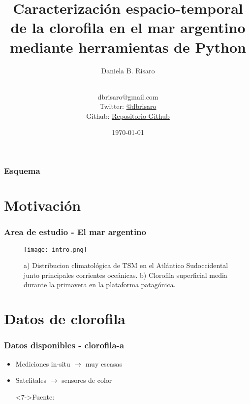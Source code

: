 \documentclass{beamer}
\title[Python para SIG]{Caracterización espacio-temporal de la clorofila en el mar argentino mediante herramientas de Python}
\subtitle{}
\author[Risaro, Daniela B]{Daniela B. Risaro\inst{1} \inst{2}}
\author[Risaro, Daniela B]{\parbox{.5\textwidth}{\centering {Daniela B. Risaro\inst{1} \inst{2}}\\[3pt]
		\scriptsize dbrisaro@gmail.com\\
		Twitter: \href{http://www.twitter.com/dbrisaro}{@dbrisaro} \\
		Github: \href{https://github.com/dbrisaro/charla_GIS}{Repositorio Github}}}
\institute[SHN-UBA] %
{
	\inst{1}%
	Departamento de Oceanografía\\
	Servicio de Hidrografía Naval (SHN)
	\and
	\inst{2}%
	Facultad de Cs Exactas y Naturales\\
	Universidad de Buenos Aires (UBA)
}
\date{\today}
\begin{document}
\begin{frame}
 \titlepage
\end{frame}

\begin{frame}
\frametitle{Esquema}
\tableofcontents
\end{frame} 

\section{Motivación}

\begin{frame}
 \frametitle{Area de estudio - El mar argentino}
 
\begin{figure}
 \texttt{[image: intro.png]}
\caption{a) Distribucion climatológica de TSM en el Atlántico Sudoccidental junto principales corrientes oceánicas. b) Clorofila superficial media durante la primavera en la plataforma patagónica.}
 \end{figure}
\end{frame}


\section{Datos de clorofila}

\begin{frame}[t]
 \frametitle{Datos disponibles - clorofila-a}

  \begin{itemize}
   \item<1-> Mediciones in-situ \pause $\rightarrow$ muy escasas
   \item<3-> Satelitales  \pause $\rightarrow$ sensores de color
      
   \begin{figure}
   \end{figure}

\item[]<7->\tiny{Fuente: \href{https://oceancolor.gsfc.nasa.gov/docs/odps_opdsmp.may2018.pdf}{}}
  \end{itemize}
\end{frame}
\end{document}
